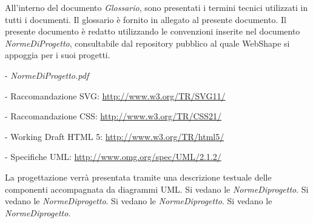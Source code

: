 All'interno del documento \textit{Glossario}, sono presentati i termini tecnici utilizzati in tutti i documenti. Il glossario \`e fornito in allegato al presente documento.
Il presente documento \`e redatto utilizzando le convenzioni inserite nel documento \textit{NormeDiProgetto}, consultabile dal repository pubblico al quale WebShape si appoggia per i suoi progetti.
\begin{elencopuntato}[\subsubsecindent]
\item[-] \textit{NormeDiProgetto.pdf}
\item[-] Raccomandazione SVG: \href{http://www.w3.org/TR/SVG11/}{http://www.w3.org/TR/SVG11/}
\item[-] Raccomandazione CSS: \href{http://www.w3.org/TR/CSS21/}{http://www.w3.org/TR/CSS21/}
\item[-] Working Draft HTML 5: \href{http://www.w3.org/TR/html5/}{http://www.w3.org/TR/html5/}
\item[-] Specifiche UML: \href{http://www.omg.org/spec/UML/2.1.2/}{http://www.omg.org/spec/UML/2.1.2/}
\end{elencopuntato}

La progettazione verr\`a presentata tramite una descrizione testuale delle componenti accompagnata da diagrammi UML.
Si vedano le \textit{NormeDiprogetto}.
Si vedano le \textit{NormeDiprogetto}.
Si vedano le \textit{NormeDiprogetto}.
Si vedano le \textit{NormeDiprogetto}.



